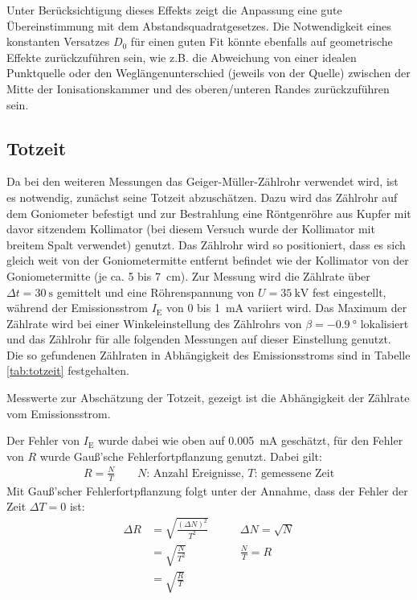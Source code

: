 \documentclass[11pt, a4paper]{article}
\numberwithin{equation}{section}
\begin{document}
Unter Berücksichtigung dieses Effekts zeigt die Anpassung eine gute Übereinstimmung mit dem Abstandsquadratgesetzes.
Die Notwendigkeit eines konstanten Versatzes $D_0$ für einen guten Fit könnte ebenfalls auf geometrische Effekte zurückzuführen sein, wie z.B. die Abweichung von einer idealen Punktquelle oder den Weglängenunterschied (jeweils von der Quelle) zwischen der Mitte der Ionisationskammer und des oberen/unteren Randes zurückzuführen sein.

\subsection{Totzeit}

Da bei den weiteren Messungen das Geiger-Müller-Zählrohr verwendet wird, ist es notwendig, zunächst seine Totzeit abzuschätzen.
Dazu wird das Zählrohr auf dem Goniometer befestigt und zur Bestrahlung eine Röntgenröhre aus Kupfer mit davor sitzendem Kollimator (bei diesem Versuch wurde der Kollimator mit breitem Spalt verwendet) genutzt.
Das Zählrohr wird so positioniert, dass es sich gleich weit von der Goniometermitte entfernt befindet wie der Kollimator von der Goniometermitte (je ca. \num{5} bis \SI{7}{cm}).
Zur Messung wird die Zählrate über $\Delta t=\SI{30}{\second}$ gemittelt und eine Röhrenspannung von $U=\SI{35}{\kilo\volt}$ fest eingestellt, während der Emissionsstrom $I_\text{E}$ von \num{0} bis \SI{1}{\milli\ampere} variiert wird.
Das Maximum der Zählrate wird bei einer Winkeleinstellung des Zählrohrs von $\beta=\SI{-0.9}{\degree}$ lokalisiert und das Zählrohr für alle folgenden Messungen auf dieser Einstellung genutzt.
Die so gefundenen Zählraten in Abhängigkeit des Emissionsstroms sind in Tabelle \ref{tab:totzeit} festgehalten.
\begin{table}[ht]
	\centering
	
	\caption{Messwerte zur Abschätzung der Totzeit, gezeigt ist die Abhängigkeit der Zählrate vom Emissionsstrom.}
	\label{tab:totzeit}
\end{table}
Der Fehler von $I_\text{E}$ wurde dabei wie oben auf \SI{0.005}{\milli\ampere} geschätzt, für den Fehler von $R$ wurde Gauß'sche Fehlerfortpflanzung genutzt.
Dabei gilt:
\begin{align}
	R = \frac{N}{T}\qquad\text{$N$: Anzahl Ereignisse, $T$: gemessene Zeit}
\end{align}
Mit Gauß'scher Fehlerfortpflanzung folgt unter der Annahme, dass der Fehler der Zeit $\Delta T=0$ ist:
\begin{align}
	\Delta R &= \sqrt{\frac{(\Delta N)^2}{T^2}} &\qquad \Delta N =\sqrt{N} \\
				 &= \sqrt{\frac{N}{T^2}} &\qquad \frac{N}{T}= R\\
				 &= \sqrt{\frac{R}{T}} \label{eq:zählrate_fehler}
\end{align}
\end{document}
